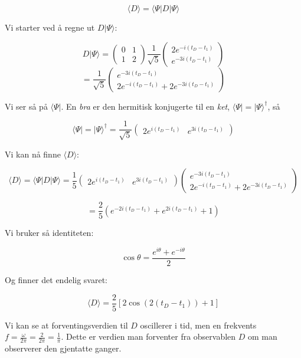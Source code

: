 \documentclass[a4paper,norsk, 10pt]{article}
\numberwithin{equation}{section}
\begin{document}
$$
\langle D\rangle = \langle\Psi | D | \Psi \rangle
$$

Vi starter ved å regne ut $D|\Psi\rangle$:

$$
D|\Psi\rangle =
\begin{pmatrix}
0 &1\\1&2
\end{pmatrix}
\frac{1}{\sqrt{5}}
\begin{pmatrix}
2e^{-i(t_D - t_1)}\\
e^{-3i(t_D - t_1)}
\end{pmatrix}
$$
$$
= \frac{1}{\sqrt{5}}
\begin{pmatrix}
e^{-3i(t_D-t_1)}\\
2e^{-i(t_D-t_1)} + 2e^{-3i(t_D-t_1)}
\end{pmatrix}
$$

Vi ser så på $\langle \Psi |$. En \textit{bra} er den hermitisk konjugerte til en \textit{ket}, $\langle\Psi| = |\Psi\rangle^{\dag}$, så

$$
\langle\Psi| = |\Psi\rangle^{\dag} = \frac{1}{\sqrt{5}}
\begin{pmatrix}
2e^{i(t_D - t_1)} &
e^{3i(t_D - t_1)}
\end{pmatrix}
$$

Vi kan nå finne $\langle D \rangle$:

$$
\langle D\rangle = \langle\Psi | D | \Psi \rangle = 
\frac{1}{5}
\begin{pmatrix}
2e^{i(t_D - t_1)} &
e^{3i(t_D - t_1)}
\end{pmatrix}
\begin{pmatrix}
e^{-3i(t_D-t_1)}\\
2e^{-i(t_D-t_1)} + 2e^{-3i(t_D-t_1)}
\end{pmatrix}
$$

$$
= \frac{2}{5}\left(e^{-2i(t_D-t_1)} + e^{2i(t_D-t_1)} + 1\right)
$$

Vi bruker så identiteten:

$$
\cos \theta = \frac{e^{i\theta} + e^{-i\theta}}{2}
$$

Og finner det endelig svaret:

\begin{equation}
\langle D\rangle = \frac{2}{5}\left[2\cos(2(t_D - t_1)) + 1\right]
\label{eq:forventningD}
\end{equation}

Vi kan se at forventingsverdien til $D$ oscillerer i tid, men en frekvents $f = \frac{\omega}{2\pi} = \frac{2}{2\pi} = \frac{1}{\pi}$. Dette er verdien man forventer fra observablen $D$ om man observerer den gjentatte ganger.
\end{document}
